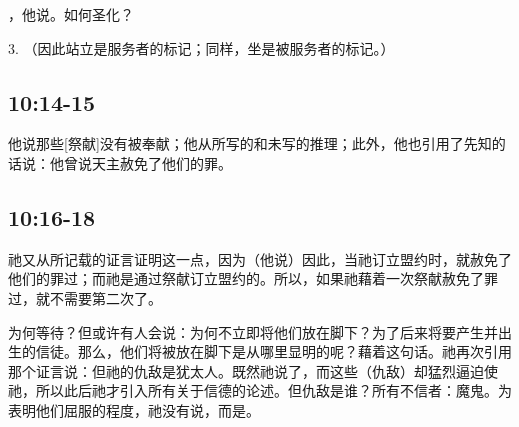 ，他说。如何圣化？\par

3. （因此站立是服务者的标记；同样，坐是被服务者的标记。）\par


\subsection{ 10:14-15}

他说那些[祭献]没有被奉献；他从所写的和未写的推理；此外，他也引用了先知的话说：他曾说天主赦免了他们的罪。\par


\subsection{ 10:16-18}

祂又从所记载的证言证明这一点，因为（他说）因此，当祂订立盟约时，就赦免了他们的罪过；而祂是通过祭献订立盟约的。所以，如果祂藉着一次祭献赦免了罪过，就不需要第二次了。\par

为何等待？但或许有人会说：为何不立即将他们放在脚下？为了后来将要产生并出生的信徒。那么，他们将被放在脚下是从哪里显明的呢？藉着这句话。祂再次引用那个证言说：但祂的仇敌是犹太人。既然祂说了，而这些（仇敌）却猛烈逼迫使祂，所以此后祂才引入所有关于信德的论述。但仇敌是谁？所有不信者：魔鬼。为表明他们屈服的程度，祂没有说，而是。\par

